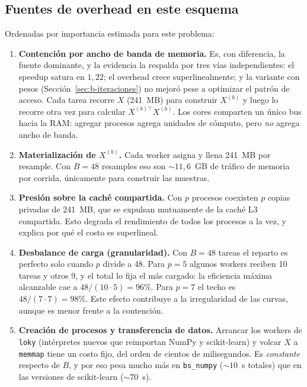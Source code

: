 \documentclass[11pt,letterpaper]{article}
\begin{document}
\subsection{Fuentes de overhead en este esquema}

Ordenadas por importancia estimada para este problema:

\begin{enumerate}
\item \textbf{Contención por ancho de banda de memoria.} Es, con diferencia, la fuente
  dominante, y la evidencia la respalda por tres vías independientes: el speedup satura en
  $1{,}22$; el overhead crece superlinealmente; y la variante con pesos
  (Sección~\ref{sec:b-iteraciones}) no mejoró pese a optimizar el patrón de acceso. Cada
  tarea recorre $X$ (241~MB) para construir $X^{(b)}$ y luego lo recorre otra vez para
  calcular $X^{(b)\top}X^{(b)}$. Los cores comparten un único bus hacia la RAM: agregar
  procesos agrega unidades de cómputo, pero \emph{no} agrega ancho de banda.

\item \textbf{Materialización de $X^{(b)}$.} Cada worker asigna y llena 241~MB por
  resample. Con $B = 48$ resamples eso son $\sim 11{,}6$~GB de tráfico de memoria por
  corrida, únicamente para construir las muestras.

\item \textbf{Presión sobre la caché compartida.} Con $p$ procesos coexisten $p$ copias
  privadas de 241~MB, que se expulsan mutuamente de la caché L3 compartida. Esto degrada
  el rendimiento de todos los procesos a la vez, y explica por qué el costo es
  superlineal.

\item \textbf{Desbalance de carga (granularidad).} Con $B = 48$ tareas el reparto es
  perfecto solo cuando $p$ divide a 48. Para $p = 5$ algunos workers reciben 10 tareas y
  otros 9, y el total lo fija el más cargado: la eficiencia máxima alcanzable cae a
  $48/(10 \cdot 5) = 96\%$. Para $p = 7$ el techo es $48/(7 \cdot 7) = 98\%$. Este efecto
  contribuye a la irregularidad de las curvas, aunque es menor frente a la contención.

\item \textbf{Creación de procesos y transferencia de datos.} Arrancar los workers de
  \texttt{loky} (intérpretes nuevos que reimportan NumPy y scikit-learn) y volcar $X$ a
  \texttt{memmap} tiene un costo fijo, del orden de cientos de milisegundos. Es
  \emph{constante} respecto de $B$, y por eso pesa mucho más en \texttt{bs\_numpy}
  ($\sim 10$~s totales) que en las versiones de scikit-learn ($\sim 70$~s).


\end{enumerate}
\end{document}
